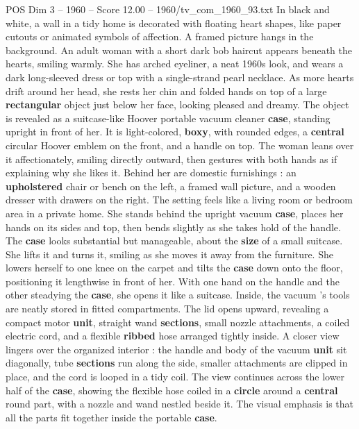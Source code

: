 \begin{textsample}{POS Dim 3 – 1960 – Score 12.00 – 1960/tv\_com\_1960\_93.txt}  \label{ex:f3_pos_027}
In black and white, a wall in a tidy home is decorated with floating heart shapes, like paper cutouts or animated symbols of affection.
A framed picture hangs in the background.
An adult woman with a short dark bob haircut appears beneath the hearts, smiling warmly.
She has arched eyeliner, a neat 1960s look, and wears a dark long-sleeved dress or top with a single-strand pearl necklace.
As more hearts drift around her head, she rests her chin and folded hands on top of a large \textbf{rectangular} object just below her face, looking pleased and dreamy.
The object is revealed as a suitcase-like Hoover portable vacuum cleaner \textbf{case}, standing upright in front of her.
It is light-colored, \textbf{boxy}, with rounded edges, a \textbf{central} circular Hoover emblem on the front, and a handle on top.
The woman leans over it affectionately, smiling directly outward, then gestures with both hands as if explaining why she likes it.
Behind her are domestic furnishings : an \textbf{upholstered} chair or bench on the left, a framed wall picture, and a wooden dresser with drawers on the right.
The setting feels like a living room or bedroom area in a private home.
She stands behind the upright vacuum \textbf{case}, places her hands on its sides and top, then bends slightly as she takes hold of the handle.
The \textbf{case} looks substantial but manageable, about the \textbf{size} of a small suitcase.
She lifts it and turns it, smiling as she moves it away from the furniture.
She lowers herself to one knee on the carpet and tilts the \textbf{case} down onto the floor, positioning it lengthwise in front of her.
With one hand on the handle and the other steadying the \textbf{case}, she opens it like a suitcase.
Inside, the vacuum ’s tools are neatly stored in fitted compartments.
The lid opens upward, revealing a compact motor \textbf{unit}, straight wand \textbf{sections}, small nozzle attachments, a coiled electric cord, and a flexible \textbf{ribbed} hose arranged tightly inside.
A closer view lingers over the organized interior : the handle and body of the vacuum \textbf{unit} sit diagonally, tube \textbf{sections} run along the side, smaller attachments are clipped in place, and the cord is looped in a tidy coil.
The view continues across the lower half of the \textbf{case}, showing the flexible hose coiled in a \textbf{circle} around a \textbf{central} round part, with a nozzle and wand nestled beside it.
The visual emphasis is that all the parts fit together inside the portable \textbf{case}.

\end{textsample}

